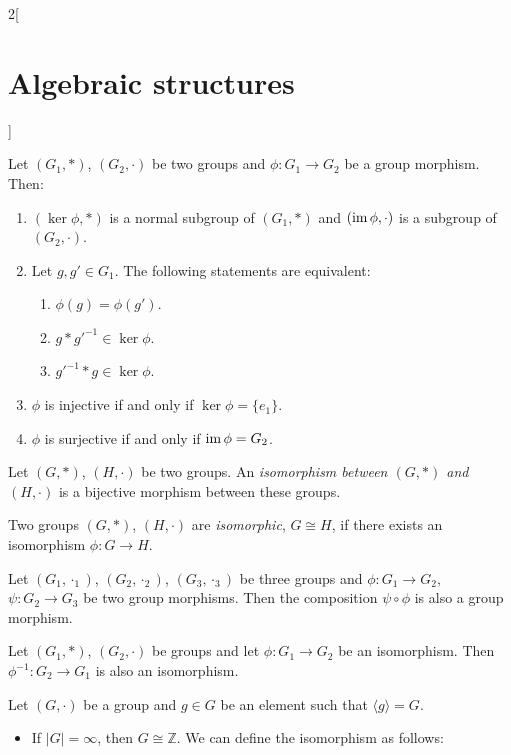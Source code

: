 \documentclass[../../../main.tex]{subfiles}
\begin{document}
\begin{multicols}{2}[\section{Algebraic structures}]
\begin{prop}
    Let $(G_1,*)$, $(G_2,\cdot)$ be two groups and $\phi:G_1\rightarrow G_2$ be a group morphism. Then:
    \begin{enumerate}
        \item $(\ker\phi,*)$ is a normal subgroup of $(G_1,*)$ and $(\operatorname{im}\phi,\cdot)$ is a subgroup of $(G_2,\cdot)$.
        \item Let $g,g'\in G_1$. The following statements are equivalent:
        \begin{enumerate}
            \item $\phi(g)=\phi(g')$.
            \item $g*g'^{-1}\in\ker\phi$.
            \item $g'^{-1}*g\in\ker\phi$.
        \end{enumerate}
        \item $\phi$ is injective if and only if $\ker\phi=\{e_1\}$.
        \item $\phi$ is surjective if and only if $\operatorname{im}\phi=G_2$.
    \end{enumerate}
\end{prop}
\begin{definition}
    Let $(G,*)$, $(H,\cdot)$ be two groups. An \textit{isomorphism between $(G,*)$ and $(H,\cdot)$} is a bijective morphism between these groups.
\end{definition}
\begin{definition}
    Two groups $(G,*)$, $(H,\cdot)$ are \textit{isomorphic}, $G\cong H$, if there exists an isomorphism $\phi:G\rightarrow H$.
\end{definition}
\begin{prop}
    Let $(G_1,\cdot_1)$, $(G_2,\cdot_2)$, $(G_3,\cdot_3)$ be three groups and $\phi:G_1\rightarrow G_2$, $\psi:G_2\rightarrow G_3$ be two group morphisms. Then the composition $\psi\circ\phi$ is also a group morphism.
\end{prop}
\begin{prop}
    Let $(G_1,*)$, $(G_2,\cdot)$ be groups and let $\phi: G_1\rightarrow G_2$ be an isomorphism. Then $\phi^{-1}: G_2\rightarrow G_1$ is also an isomorphism.
\end{prop}
\begin{theorem}
    Let $(G,\cdot)$ be a group and $g\in G$ be an element such that $\langle g\rangle=G$.
    \begin{itemize}
        \item If $|G|=\infty$, then $G\cong\mathbb{Z}$. We can define the isomorphism as follows: 

\end{itemize}
\end{theorem}
\end{multicols}
\end{document}
